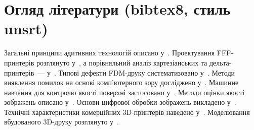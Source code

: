 \documentclass[14pt]{extarticle}
\begin{document}
\section*{Огляд літератури (bibtex8, стиль unsrt)}

Загальні принципи адитивних технологій описано у~\cite{Gibson2021}.
Проектування FFF-принтерів розглянуто у~\cite{Soni2021},
а порівняльний аналіз картезіанських та дельта-принтерів~--- у~\cite{Schmitt2018}.
Типові дефекти FDM-друку систематизовано у~\cite{Baechle2022}.
Методи виявлення помилок на основі комп'ютерного зору досліджено
у~\cite{Baumann2016, Langeland2020, Paulsen2019}.
Машинне навчання для контролю якості поверхні застосовано у~\cite{Kadam2021}.
Методи оцінки якості зображень описано у~\cite{Crete2007, Wang2005}.
Основи цифрової обробки зображень викладено у~\cite{Gonzalez2018}.
Технічні характеристики комерційних 3D-принтерів наведено у~\cite{BambuLabA1Mini}.
Моделювання вбудованого 3D-друку розглянуто у~\cite{VanDriel2025}.

\nocite{*}



\end{document}
